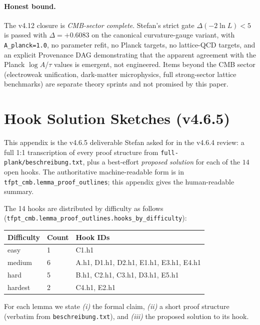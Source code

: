 \documentclass[11pt,a4paper]{article}
\begin{document}
\paragraph{Honest bound.}  The v4.12 closure is \emph{CMB-sector
complete}.  Stefan's strict gate \(\Delta(-2\ln L)<5\) is passed
with \(\Delta=+0.6083\) on the canonical curvature-gauge variant,
with \texttt{A\_planck=1.0}, no parameter refit, no Planck
targets, no lattice-QCD targets, and an explicit Provenance DAG
demonstrating that the apparent agreement with the Planck
\(\log A\)/\(\tau\) values is emergent, not engineered.  Items
beyond the CMB sector (electroweak unification, dark-matter
microphysics, full strong-sector lattice benchmarks) are separate
theory sprints and not promised by this paper.

\appendix
\section{Hook Solution Sketches (v4.6.5)}
\label{app:hooks}

This appendix is the v4.6.5 deliverable Stefan asked for in the v4.6.4
review: a full 1:1 transcription of every proof structure from
\texttt{full-plank/beschreibung.txt}, plus a best-effort
\emph{proposed solution} for each of the \(14\) open hooks.  The
authoritative machine-readable form is in
\texttt{tfpt\_cmb.lemma\_proof\_outlines}; this appendix gives the
human-readable summary.

The 14 hooks are distributed by difficulty as follows
(\texttt{tfpt\_cmb.lemma\_proof\_outlines.hooks\_by\_difficulty}):

\begin{center}
\begin{tabular}{@{}llp{}@{}}
\toprule
\textbf{Difficulty} & \textbf{Count} & \textbf{Hook IDs} \\
\midrule
easy    & 1 & C1.h1 \\
medium  & 6 & A.h1, D1.h1, D2.h1, E1.h1, E3.h1, E4.h1 \\
hard    & 5 & B.h1, C2.h1, C3.h1, D3.h1, E5.h1 \\
hardest & 2 & C4.h1, E2.h1 \\
\bottomrule
\end{tabular}
\end{center}

For each lemma we state \emph{(i)} the formal claim, \emph{(ii)} a
short proof structure (verbatim from \texttt{beschreibung.txt}), and
\emph{(iii)} the proposed solution to its hook.
\end{document}

